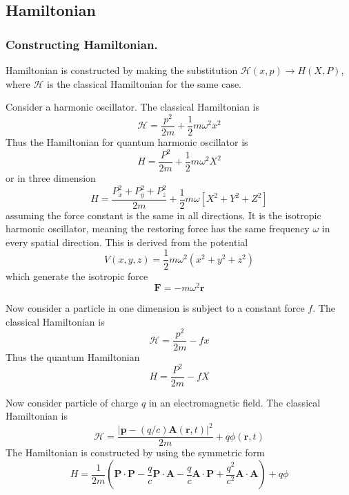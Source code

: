 \documentclass[../../../main.tex]{subfiles}
\begin{document}
\subsection{Hamiltonian}
\subsubsection{Constructing Hamiltonian.}
Hamiltonian is constructed by making the substitution $\mathcal{H}(x,p) \rightarrow H(X,P)$, where $\mathcal{H }$ is the classical Hamiltonian for the same case.

Consider a harmonic oscillator.
The classical Hamiltonian is
\begin{equation*}
    \mathcal{H }=\frac{p^2 }{2m }+\frac{1 }{2 }m\omega^2x^2
\end{equation*}
Thus the Hamiltonian for quantum harmonic oscillator is
\begin{equation*}
    H=\frac{P^2 }{2m }+\frac{1 }{2 }m\omega^2X^2
\end{equation*}
or in three dimension
\begin{equation*}
    H=\frac{P_x^2+P_y^2+P_z^2}{2m  }+\frac{1 }{2}m\omega \left[ X^2+Y^2+Z^2 \right]
\end{equation*}
assuming the force constant is the same in all directions.
It is the isotropic harmonic oscillator, meaning the restoring force has the same frequency $\omega$ in every spatial direction.
This is derived from the potential
\begin{equation*}
    V(x,y,z) = \frac{1}{2} m \omega^2 (x^2 + y^2 + z^2)
\end{equation*}
which generate the isotropic force
\begin{equation*}
    \mathbf{F }= -m \omega^2 \mathbf{r}
\end{equation*}

Now consider a particle in one dimension is subject to a constant force $f$.
The classical Hamiltonian is
\begin{equation*}
    \mathcal{H }=\frac{p^2 }{2m }-fx
\end{equation*}
Thus the quantum Hamiltonian
\begin{equation*}
    H=\frac{P^2 }{2m }-fX
\end{equation*}

Now consider particle of charge $q$ in an electromagnetic field.
The classical Hamiltonian is
\begin{equation*}
    \mathcal{H }=\frac{|\mathbf{p }-(q/c) \mathbf{A}(\mathbf{r},t)|^2 }{2m }+q\phi(\mathbf{r },t)
\end{equation*}
The Hamiltonian is constructed by using the symmetric form
\begin{equation*}
    H=\frac{1}{2m }\left( \mathbf{P }\cdot \mathbf{P }-\frac{q }{c }\mathbf{P }\cdot \mathbf{A}-\frac{q }{c}\mathbf{A}\cdot \mathbf{P}+\frac{q^2 }{c^2}\mathbf{A }\cdot \mathbf{A} \right) +q\phi
\end{equation*}
\end{document}
